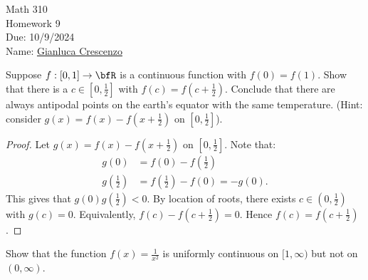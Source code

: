 \documentclass[11pt,twoside,openany]{memoir}
\begin{document}
\begin{center}
{\large Math 310 \\[0.1in]Homework 9 \\[0.1in]
Due: 10/9/2024}\\[.25in]
{Name:} {\underline{Gianluca Crescenzo\hspace*{2in}}}\\[0.15in]
\end{center}
\vspace{4pt}
    \begin{exercise}
        Suppose $f:[0,1] \rightarrow \bfR$ is a continuous function with $f(0) = f(1)$. Show that there is a $c \in \left[0, \frac{1}{2}\right]$ with $f(c) = f \left(c + \frac{1}{2}\right)$. Conclude that there are always antipodal points on the earth's equator with the same temperature. (Hint: consider $g(x) = f(x) - f \left(x+ \frac{1}{2}\right)$ on $\left[0, \frac{1}{2}\right]$).
    \end{exercise}
        \begin{proof}
            Let $g(x) = f(x) - f \left(x+ \frac{1}{2}\right)$ on $\left[0, \frac{1}{2}\right]$. Note that:
                \begin{equation*}
                \begin{split}
                    g(0) &= f(0) - f \left(\textstyle \frac{1}{2}\right) \\
                    g(\textstyle \frac{1}{2}) &= f(\textstyle \frac{1}{2}) - f(0) = -g(0).
                \end{split}
                \end{equation*}
            This gives that $g(0)g(\frac{1}{2}) < 0$. By location of roots, there exists $c \in (0,\frac{1}{2})$ with $g(c) = 0$. Equivalently, $f(c) - f(c+\frac{1}{2}) = 0$. Hence $f(c) = f(c + \frac{1}{2})$.
        \end{proof}
    \begin{exercise}
        Show that the function $f(x) = \frac{1}{x^2}$ is uniformly continuous on $[1,\infty)$ but not on $(0,\infty)$.
    \end{exercise}
\end{document}
